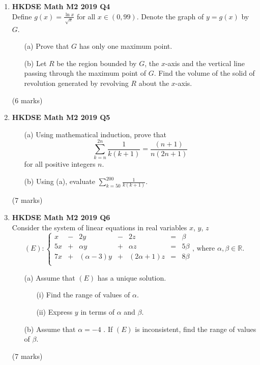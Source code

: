 \documentclass{report}
\begin{document}
\begin{enumerate}
	\item \textbf{HKDSE Math M2 2019 Q4}\\
	Define $\displaystyle g(x) = \frac{\ln{x}}{\sqrt{x}}$ for all $x \in (0,99)$. Denote the graph of $y = g(x) $ by $G$. 
	\begin{enumerate}
		\item [(a)]Prove that $G$ has only one maximum point. 
		\item [(b)]Let $R$ be the region bounded by $G$, the $x$-axis and the vertical line passing through the maximum point of $G$. Find the volume of the solid of revolution generated by revolving $R$ about the $x$-axis.
	\end{enumerate}
	(6 marks)

	\newpage

	\item\textbf{HKDSE Math M2 2019 Q5}
	\begin{enumerate}
		\item [(a)] Using mathematical induction, prove that $$\displaystyle \sum_{k = n}^{2n} \frac{1}{k(k+1)} = \frac{(n+1)}{n(2n+1)}$$ for all positive integers $n$.
		\item [(b)] Using (a), evaluate $\displaystyle \sum_{k = 50}^{200} \frac{1}{k(k+1)}$.
	\end{enumerate}
	(7 marks)

	\item \textbf{HKDSE Math M2 2019 Q6}\\
	Consider the system of linear equations in real variables $x$, $y$, $z$
	$$(E):\left\{\begin{matrix}
		 x&  -&2y&  -&2z& = &\beta  \\
		5x&  +&\alpha y&  +&\alpha z& = & 5\beta \\
	7x&  +&(\alpha - 3)y&  +&(2\alpha+1)z& = & 8\beta \\
		\end{matrix}\right.\text{, where }\alpha, \beta \in \mathbb{R}.$$
	\begin{enumerate}
		\item [(a)]Assume that $(E)$ has a unique solution.
		\begin{enumerate}
			\item [(i)]Find the range of values of $\alpha$. 
			\item [(ii)]Express $y$ in terms of $\alpha$ and $\beta$. 
		\end{enumerate}
		\item [(b)]Assume that $\alpha = -4$ . If  $(E)$ is inconsistent, find the range of values of $\beta$.
	\end{enumerate}
	(7 marks)


\end{enumerate}
\end{document}
